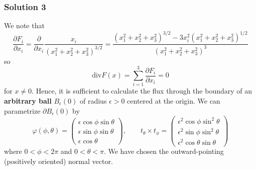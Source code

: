 \documentclass[10pt, t, allowdisplaybreaks]{beamer}
\begin{document}
\begin{frame}
    \frametitle{Solution 3}
    \par We note that 
    \begin{equation*}
        \frac{\partial F_i}{\partial x_i} = \frac{\partial }{\partial x_i}\frac{x_i}{(x_1^2+x_2^2+x_3^2)^{3/2}} = \frac{(x_1^2+x_2^2+x_3^2)^{3/2} - 3x_i^2(x_1^2+x_2^2+x_3^2)^{1/2}}{(x_1^2+x_2^2+x_3^2)^{3}}
    \end{equation*}
    so 
    \begin{equation*}
        \text{div}F(x) = \sum^3_{i = 1}\frac{\partial F_i}{\partial x_i} = 0
    \end{equation*}
    for $x\neq 0$. Hence, it is sufficient to calculate the flux through the boundary of an \textbf{arbitrary ball} $B_\epsilon(0)$ of radius $\epsilon>0$
    centered at the origin. We can parametrize $\partial B_\epsilon(0)$ by 
    \begin{equation*}
        \varphi(\phi, \theta) = \begin{pmatrix}
            \epsilon \cos \phi \sin \theta\\
            \epsilon \sin\phi \sin\theta\\
            \epsilon\cos\theta
        \end{pmatrix}, \qquad
        t_\theta\times t_\phi = \begin{pmatrix}
            \epsilon^2\cos\phi\sin^2\theta\\
            \epsilon^2\sin\phi\sin^2\theta\\
            \epsilon^2\cos\theta\sin\theta
        \end{pmatrix}
    \end{equation*}
    where $0<\phi<2\pi$ and $0<\theta<\pi$. We have chosen the outward-pointing (positively oriented) normal vector.
\end{frame}
\end{document}
